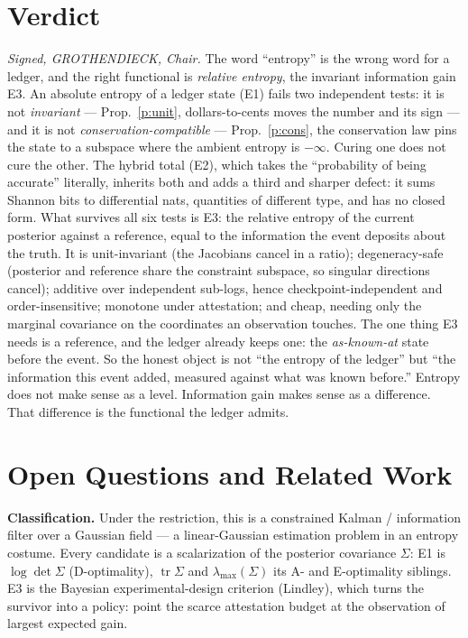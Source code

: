 \documentclass[11pt]{article}
\theoremstyle{definition}\newtheorem{definition}{Definition}
\theoremstyle{plain}\newtheorem{proposition}{Proposition}
\theoremstyle{remark}\newtheorem{remark}{Remark}
\newcommand{\cov}{\Sigma}
\DeclareMathOperator{\tr}{tr}
\begin{document}
\section{Verdict}
\emph{Signed, GROTHENDIECK, Chair.}
The word ``entropy'' is the wrong word for a ledger, and the right functional is
\emph{relative entropy}, the invariant information gain E3.
An absolute entropy of a ledger state (E1) fails two independent tests: it is not
\emph{invariant} --- Prop.~\ref{p:unit}, dollars-to-cents moves the number and its sign --- and it
is not \emph{conservation-compatible} --- Prop.~\ref{p:cons}, the conservation law pins the state
to a subspace where the ambient entropy is $-\infty$. Curing one does not cure the other. The
hybrid total (E2), which takes the ``probability of being accurate'' literally, inherits both and
adds a third and sharper defect: it sums Shannon bits to differential nats, quantities of
different type, and has no closed form. What survives all six tests is E3: the relative entropy of
the current posterior against a reference, equal to the information the event deposits about the
truth. It is unit-invariant (the Jacobians cancel in a ratio); degeneracy-safe (posterior and
reference share the constraint subspace, so singular directions cancel); additive over
independent sub-logs, hence checkpoint-independent and order-insensitive; monotone under
attestation; and cheap, needing only the marginal covariance on the coordinates an observation
touches. The one thing E3 needs is a reference, and the ledger already keeps one: the
\emph{as-known-at} state before the event. So the honest object is not ``the entropy of the
ledger'' but ``the information this event added, measured against what was known before.''
Entropy does not make sense as a level. Information gain makes sense as a difference. That
difference is the functional the ledger admits.

\section{Open Questions and Related Work}
\textbf{Classification.} Under the restriction, this is a constrained Kalman / information filter
over a Gaussian field --- a linear-Gaussian estimation problem in an entropy costume. Every
candidate is a scalarization of the posterior covariance $\cov$: E1 is $\log\det\cov$
(D-optimality), $\tr\cov$ and $\lambda_{\max}(\cov)$ its A- and E-optimality siblings. E3 is the
Bayesian experimental-design criterion (Lindley), which turns the survivor into a policy: point
the scarce attestation budget at the observation of largest expected gain.
\end{document}
